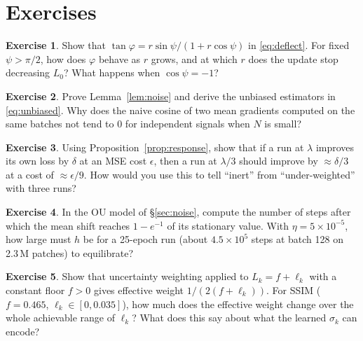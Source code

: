 \documentclass[11pt,a4paper]{article}
\theoremstyle{definition}
\newtheorem{exercise}{Exercise}
\theoremstyle{remark}
\begin{document}
\section{Exercises}

\begin{exercise}
Show that $\tan\varphi=r\sin\psi/(1+r\cos\psi)$ in \eqref{eq:deflect}. For fixed
$\psi>\pi/2$, how does $\varphi$ behave as $r$ grows, and at which $r$ does the update stop
decreasing $L_0$? What happens when $\cos\psi=-1$?
\end{exercise}

\begin{exercise}
Prove Lemma~\ref{lem:noise} and derive the unbiased estimators in \eqref{eq:unbiased}.
Why does the naive cosine of two mean gradients computed on the same batches not tend to
$0$ for independent signals when $N$ is small?
\end{exercise}

\begin{exercise}
Using Proposition~\ref{prop:response}, show that if a run at $\lambda$ improves its own loss
by $\delta$ at an MSE cost $\epsilon$, then a run at $\lambda/3$ should improve by
$\approx\delta/3$ at a cost of $\approx\epsilon/9$. How would you use this to tell
``inert'' from ``under-weighted'' with three runs?
\end{exercise}

\begin{exercise}
In the OU model of \S\ref{sec:noise}, compute the number of steps after which the mean
shift reaches $1-e^{-1}$ of its stationary value. With $\eta=5\times10^{-5}$, how large
must $h$ be for a 25-epoch run (about $4.5\times10^5$ steps at batch 128 on 2.3\,M patches)
to equilibrate?
\end{exercise}

\begin{exercise}
Show that uncertainty weighting applied to $L_k=f+\ell_k$ with a constant floor $f>0$ gives
effective weight $1/(2(f+\ell_k))$. For SSIM ($f=0.465$, $\ell_k\in[0,0.035]$), how much does
the effective weight change over the whole achievable range of $\ell_k$? What does this say
about what the learned $\sigma_k$ can encode?
\end{exercise}
\end{document}
